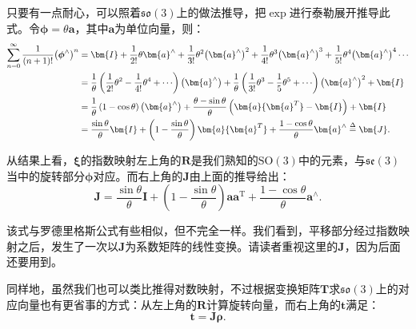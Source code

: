 只要有一点耐心，可以照着$\mathfrak{so}(3)$上的做法推导，把$\exp$进行泰勒展开推导此式。令$\boldsymbol{\phi}=\theta \bm{a}$，其中$\bm{a}$为单位向量，则：
\begin{equation}
	\begin{aligned}
		\sum\limits_{n = 0}^\infty  {\frac{1}{{\left( {n + 1} \right)!}}{{\left( {{\boldsymbol{\phi} ^ \wedge }} \right)}^n}} &= \bm{I} + \frac{1}{{2!}}\theta {\bm{a}^ \wedge } + \frac{1}{{3!}}{\theta ^2}{\left( {{\bm{a}^ \wedge }} \right)^2} + \frac{1}{{4!}}{\theta ^3}{\left( {{\bm{a}^ \wedge }} \right)^3} + \frac{1}{{5!}}{\theta ^4}{\left( {{\bm{a}^ \wedge }} \right)^4} \cdots \\
		&= \frac{1}{\theta }\left( {\frac{1}{{2!}}{\theta ^2} - \frac{1}{{4!}}{\theta ^4} +  \cdots } \right)\left( {{\bm{a}^ \wedge }} \right) + \frac{1}{\theta }\left( {\frac{1}{{3!}}{\theta ^3} - \frac{1}{5}{\theta ^5} + \cdots } \right){\left( {{\bm{a}^ \wedge }} \right)^2} + \bm{I}\\
		&= \frac{1}{\theta }\left( {1 - \cos \theta } \right)\left( {{\bm{a}^ \wedge }} \right) + \frac{{\theta  - \sin \theta }}{\theta }\left( {\bm{a}{\bm{a}^T} - \bm{I}} \right) + \bm{I}\\
		&= \frac{{\sin \theta }}{\theta }\bm{I} + \left( {1 - \frac{{\sin \theta }}{\theta }} \right)\bm{a}{\bm{a}^T} + \frac{{1 - \cos \theta }}{\theta }{\bm{a}^ \wedge } \buildrel \Delta \over = \bm{J}.
	\end{aligned}
\end{equation}

从结果上看，$\boldsymbol{\xi}$的指数映射左上角的$\bm{R}$是我们熟知的$\mathrm{SO}(3)$中的元素，与$\mathfrak{se}(3)$当中的旋转部分$\boldsymbol{\phi}$对应。而右上角的$\bm{J}$由上面的推导给出：
\begin{equation}
\label{eq:lieAlgebraJacobian}
\bm{J} = \frac{{\sin \theta }}{\theta } \bm{I} + \left( {1 - \frac{{\sin \theta }}{\theta }} \right) \bm{a} { \bm{a}^\mathrm{T}} + \frac{{1 - \cos \theta }}{\theta }{ \bm{a}^ \wedge }.
\end{equation}

该式与罗德里格斯公式有些相似，但不完全一样。我们看到，平移部分经过指数映射之后，发生了一次以$\bm{J}$为系数矩阵的线性变换。请读者重视这里的$\bm{J}$，因为后面还要用到。

同样地，虽然我们也可以类比推得对数映射，不过根据变换矩阵$\bm{T}$求$\mathfrak{so}(3)$上的对应向量也有更省事的方式：从左上角的$\bm{R}$计算旋转向量，而右上角的$\bm{t}$满足：
\begin{equation}
	\bm{t} = \bm{J} \boldsymbol{\rho}.
\end{equation}

